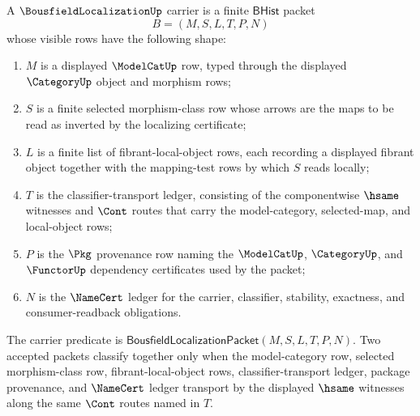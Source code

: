 \begin{definition}
\label{def:bousfieldlocalization-carrier}
A $\BousfieldLocalizationUp$ carrier is a finite $\mathsf{BHist}$ packet
$$
B=(M,S,L,T,P,N)
$$
whose visible rows have the following shape:
\begin{enumerate}
\item $M$ is a displayed $\ModelCatUp$ row, typed through the displayed $\CategoryUp$ object and morphism rows;
\item $S$ is a finite selected morphism-class row whose arrows are the maps to be read as inverted by the localizing certificate;
\item $L$ is a finite list of fibrant-local-object rows, each recording a displayed fibrant object together with the mapping-test rows by which $S$ reads locally;
\item $T$ is the classifier-transport ledger, consisting of the componentwise $\hsame$ witnesses and $\Cont$ routes that carry the model-category, selected-map, and local-object rows;
\item $P$ is the $\Pkg$ provenance row naming the $\ModelCatUp$, $\CategoryUp$, and $\FunctorUp$ dependency certificates used by the packet;
\item $N$ is the $\NameCert$ ledger for the carrier, classifier, stability, exactness, and consumer-readback obligations.
\end{enumerate}
The carrier predicate is $\mathsf{BousfieldLocalizationPacket}(M,S,L,T,P,N)$. Two accepted packets classify together only when the model-category row, selected morphism-class row, fibrant-local-object rows, classifier-transport ledger, package provenance, and $\NameCert$ ledger transport by the displayed $\hsame$ witnesses along the same $\Cont$ routes named in $T$.
\end{definition}

